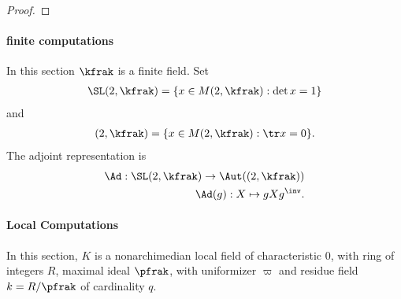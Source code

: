 \begin{proof}
















\end{proof}

\paragraph{finite computations}
In this section $\kfrak$ is a finite field. Set
\begin{align*}
    \SL(2,\kfrak) = \{ x \in M(2,\kfrak) : \det x =1 \}
\end{align*}
and
\begin{align*}
    \sl(2,\kfrak) = \{ x \in M(2,\kfrak) : \tr x = 0 \}.
\end{align*}
The adjoint representation is
\begin{align*}
    \Ad : \SL(2,\kfrak) \to \Aut(\sl(2,\kfrak)) \\
    \Ad(g):  X \mapsto  g X g^\inv.
\end{align*}

\paragraph{Local Computations}
In this section, $K$ is a nonarchimedian local field of characteristic $0$, with ring of integers $R$, maximal ideal $\pfrak$, with uniformizer $\varpi$ and residue field $k = R/\pfrak$ of cardinality $q$.

